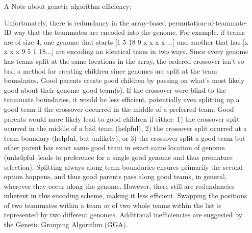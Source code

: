  A Note about genetic algorithm efficiency\+: \begin{DoxyVerb} Unfortunately, there is redundancy in the array-based permutation-of-teammate-ID way that the teammates
 are encoded into the genome. For example, if teams are of size 4, one genome that starts
 [1 5 18 9 x x x x ...] and another that has [x x x x 9 5 1 18...] are encoding an identical team in two
 ways. Since every genome has teams split at the same locations in the array, the ordered crossover
 isn't so bad a method for creating children since genomes are split at the team boundaries. Good
 parents create good children by passing on what's most likely good about their genome--good team(s). If
 the crossover were blind to the teammate boundaries, it would be less efficient, potentially even
 splitting up a good team if the crossover occurred in the middle of a preferred team. Good parents
 would more likely lead to good children if either: 1) the crossover split ocurred in the middle of a
 bad team (helpful), 2) the crossover split ocurred at a team boundary (helpful, but unlikely), or
 3) the crossover split a good team but other parent has exact same good team in exact same location of
 genome (unhelpful--leads to preference for a single good genome and thus premature selection).
 Splitting always along team boundaries ensures primarily the second option happens, and thus good
 parents pass along good teams, in general, wherever they occur along the genome. However, there still
 are redundancies inherent in this encoding scheme, making it less efficient. Swapping the positions of
 two teammates within a team or of two whole teams within the list is represented by two different
 genomes. Additional inefficiencies are suggested by the Genetic Grouping Algorithm (GGA).
\end{DoxyVerb}


